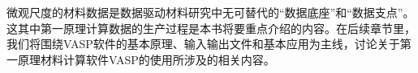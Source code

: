 微观尺度的材料数据是数据驱动材料研究中无可替代的“数据底座”和“数据支点”。这其中第一原理计算数据的生产过程是本书将要重点介绍的内容。在后续章节里，我们将围绕\textrm{VASP}软件的基本原理、输入输出文件和基本应用为主线，讨论关于第一原理材料计算软件\textrm{VASP}的使用所涉及的相关内容。
%
%
%
%
%
%
%
%
%
